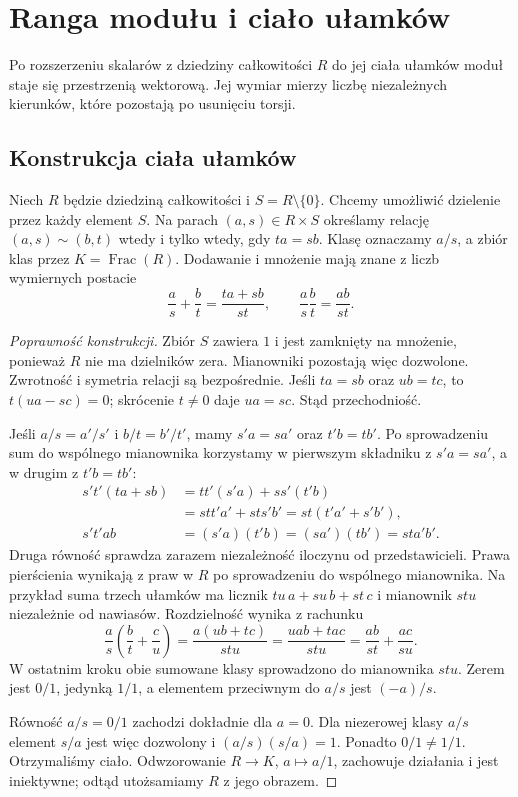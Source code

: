 \section{Ranga modułu i ciało ułamków}
\label{sec:ranga-modulu}

Po rozszerzeniu skalarów z dziedziny całkowitości $R$ do jej
ciała ułamków moduł staje się przestrzenią wektorową. Jej wymiar
mierzy liczbę niezależnych kierunków, które pozostają po usunięciu
torsji.

\subsection*{Konstrukcja ciała ułamków}

\begin{definicja}
\label{def:cialo-ulamkow-5}
Niech $R$ będzie dziedziną całkowitości i $S=R\setminus\{0\}$.
Chcemy umożliwić dzielenie przez każdy element $S$.
Na parach $(a,s)\in R\times S$ określamy relację
$(a,s)\sim(b,t)$ wtedy i tylko wtedy, gdy $ta=sb$.
Klasę oznaczamy $a/s$, a zbiór klas przez $K=\operatorname{Frac}(R)$.
Dodawanie i mnożenie mają znane z liczb wymiernych postacie
\[
 \frac as+\frac bt=\frac{ta+sb}{st},\qquad
 \frac as\frac bt=\frac{ab}{st}.
\]
\end{definicja}

\begin{proof}[Poprawność konstrukcji]
Zbiór $S$ zawiera $1$ i jest zamknięty na mnożenie, ponieważ $R$
nie ma dzielników zera. Mianowniki pozostają więc dozwolone.
Zwrotność i symetria relacji są bezpośrednie. Jeśli $ta=sb$ oraz
$ub=tc$, to $t(ua-sc)=0$; skrócenie $t\ne0$ daje $ua=sc$.
Stąd przechodniość.

Jeśli $a/s=a'/s'$ i $b/t=b'/t'$, mamy $s'a=sa'$ oraz $t'b=tb'$.
Po sprowadzeniu sum do wspólnego mianownika korzystamy
w pierwszym składniku z $s'a=sa'$, a w drugim z $t'b=tb'$:
\[
 \begin{aligned}
 s't'(ta+sb)
 &=tt'(s'a)+ss'(t'b)\\
 &=stt'a'+sts'b'=st(t'a'+s'b'),\\
 s't'ab&=(s'a)(t'b)=(sa')(tb')=sta'b'.
 \end{aligned}
\]
Druga równość sprawdza zarazem niezależność iloczynu od przedstawicieli.
Prawa pierścienia wynikają z praw w $R$ po sprowadzeniu do wspólnego
mianownika. Na przykład suma trzech ułamków ma licznik
$tu\,a+su\,b+st\,c$ i mianownik $stu$ niezależnie od nawiasów.
Rozdzielność wynika z rachunku
\[
 \frac as\left(\frac bt+\frac cu\right)
 =\frac{a(ub+tc)}{stu}
 =\frac{uab+tac}{stu}
 =\frac{ab}{st}+\frac{ac}{su}.
\]
W ostatnim kroku obie sumowane klasy sprowadzono do mianownika $stu$.
Zerem jest $0/1$, jedynką $1/1$, a elementem przeciwnym do $a/s$ jest $(-a)/s$.

Równość $a/s=0/1$ zachodzi dokładnie dla $a=0$.
Dla niezerowej klasy $a/s$ element $s/a$ jest więc dozwolony
i $(a/s)(s/a)=1$. Ponadto $0/1\ne1/1$. Otrzymaliśmy ciało.
Odwzorowanie $R\to K$, $a\mapsto a/1$, zachowuje działania i jest
iniektywne; odtąd utożsamiamy $R$ z jego obrazem.
\end{proof}

